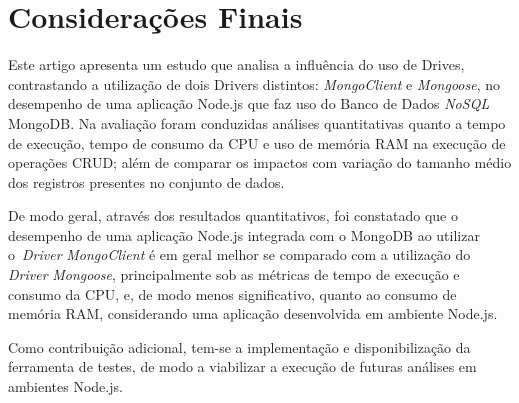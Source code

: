\documentclass{svproc}
\begin{document}

\section{Considerações Finais}
\label{section:consideracoes}

Este artigo apresenta um estudo que analisa a influência do uso de Drives, contrastando a utilização de dois Drivers distintos: \emph{MongoClient} e \emph{Mongoose}, no desempenho de uma aplicação Node.js que faz uso do Banco de Dados \emph{NoSQL} MongoDB.%
Na avaliação foram conduzidas análises quantitativas quanto a tempo de execução, tempo de consumo da CPU e uso de memória RAM na execução de operações CRUD; além de comparar os impactos com variação do tamanho médio dos registros presentes no conjunto de dados.

De modo geral, através dos resultados quantitativos, foi constatado que o desempenho de uma aplicação Node.js integrada com o MongoDB ao utilizar o~\emph{Driver} \emph{MongoClient} é em geral melhor se comparado com a utilização do \emph{Driver} \emph{Mongoose}, principalmente sob as métricas de tempo de execução e consumo da CPU, e, de modo menos significativo, quanto ao consumo de memória RAM, considerando uma aplicação desenvolvida em ambiente Node.js.

Como contribuição adicional, tem-se a implementação e disponibilização da ferramenta de testes, de modo a viabilizar a execução de futuras análises em ambientes Node.js.

%
%
%
%
\end{document}
